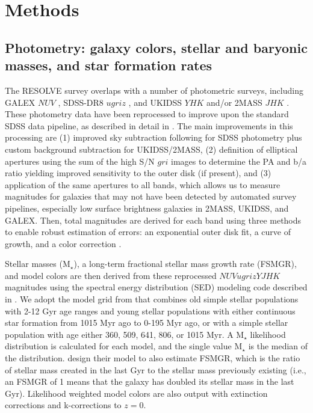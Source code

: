 \documentclass[iop,apj]{emulateapj}
\begin{document}
\section{Methods}
\label{methods}

\subsection{Photometry: galaxy colors, stellar and baryonic masses, and star formation rates}
\label{phot}
  The RESOLVE survey overlaps with a number of photometric surveys, including GALEX $NUV$ \citep{Morrissey2007}, SDSS-DR8 $ugriz$ \citep{Aihara2011}, and UKIDSS $YHK$ and/or 2MASS $JHK$ \citep{Skrutskie2006}. These photometry data have been reprocessed to improve upon the standard SDSS data pipeline, as described in detail in \citet{Eckert2015}. The main improvements in this processing are (1) improved sky subtraction following \citet{Blanton2011} for SDSS photometry plus custom background subtraction for UKIDSS/2MASS, (2) definition of elliptical apertures using the sum of the high S/N $gri$ images to determine the PA and b/a ratio yielding improved sensitivity to the outer disk (if present), and (3) application of the same apertures to all bands, which allows us to measure magnitudes for galaxies that may not have been detected by automated survey pipelines, especially low surface brightness galaxies in 2MASS, UKIDSS, and GALEX. Then, total magnitudes are derived for each band using three methods to enable robust estimation of errors: an exponential outer disk fit, a curve of growth, and a color correction  \citep[Figure 2 in][]{Eckert2015}. 

Stellar masses ($\text{M}_{\star}$), a long-term fractional stellar mass growth rate (FSMGR), and model colors are then derived from these reprocessed $NUVugrizYJHK$ magnitudes using the spectral energy distribution (SED) modeling code described in  \citet{Kannappan2013}. We adopt the model grid from \citet{Kannappan2013} that combines old simple stellar populations with 2-12 Gyr age ranges and young stellar populations with either continuous star formation from 1015 Myr ago to 0-195 Myr ago, or with a simple stellar population with age either 360, 509, 641, 806, or 1015 Myr. A $\text{M}_{\star}$ likelihood distribution is calculated for each model, and the single value $\text{M}_{\star}$ is the median of the distribution. \citet{Kannappan2013} design their model to also estimate FSMGR, which is the ratio of stellar mass created in the last Gyr to the stellar mass previously existing (i.e., an FSMGR of 1 means that the galaxy has doubled its stellar mass in the last Gyr). Likelihood weighted model colors are also output with extinction corrections and k-corrections to $z=0$. 
\end{document}
